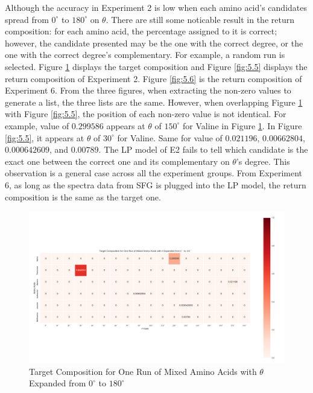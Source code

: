 Although the accuracy in Experiment 2 is low when each amino acid's candidates spread from $0^{\circ}$ to $180^{\circ}$ on $\theta$. There are still some noticable result in the return composition: for each amino acid, the percentage assigned to it is correct; however, the candidate presented may be the one with the correct degree, or the one with the correct degree's complementary. For example, a random run is selected. Figure \ref{fig:5.4} displays the target composition and Figure \ref{fig:5.5} displays the return composition of Experiment 2. Figure \ref{fig:5.6} is the return composition of Experiment 6. From the three figures, when extracting the non-zero values to generate a list, the three lists are the same. However, when overlapping Figure \ref{fig:5.4} with Figure  \ref{fig:5.5}, the position of each non-zero value is not identical. For example, value of $0.299586$ appears at $\theta$ of $150^{\circ}$ for Valine in Figure \ref{fig:5.4}. In Figure \ref{fig:5.5}, it appears at $\theta$ of $30^{\circ}$ for Valine. Same for value of $0.021196$, $0.00662804$, $0.000642609$, and $0.00789$. The LP model of E2 fails to tell which candidate is the exact one between the correct one and its complementary on $\theta$'s degree. This observation is a general case across all the experiment groups. From Experiment 6, as long as the spectra data from SFG is plugged into the LP model, the return composition is the same as the target one. \\


\begin{figure}[!ht] \label{fig:5.4}
\centering
\includegraphics[scale=0.4]{Figures/mixture_target_composition_for_one_run_theta_0_180.png}
\caption{Target Composition for One Run of Mixed Amino Acids with $\theta$ Expanded from $0^{\circ}$ to $180^{\circ}$} 
\end{figure}

